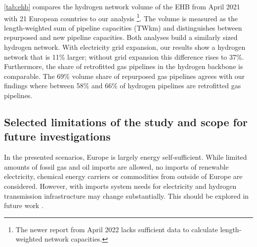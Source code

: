 
\cref{tab:ehb} compares the hydrogen network volume of the EHB from April 2021 with 21 European countries
to our analysis \cite{gasforclimateExtendingEuropean2021}\footnote{The newer
report from April 2022 \cite{gasforclimateEuropeanHydrogen2022} lacks sufficient
data to calculate length-weighted network capacities.}. The volume is measured
as the length-weighted sum of pipeline capacities (TWkm) and distinguishes
between repurposed and new pipeline capacities. Both analyses build a similarly
sized hydrogen network. With electricity grid expansion, our results show a
hydrogen network that is 11\% larger; without grid expansion this difference
rises to 37\%. Furthermore, the share of retrofitted gas pipelines in the
hydrogen backbone is comparable. The 69\% volume share of repurposed gas
pipelines \cite{gasforclimateExtendingEuropean2021} agrees with our findings
where between 58\% and 66\% of hydrogen pipelines are retrofitted gas pipelines.

\subsection*{Selected limitations of the study and scope for future investigations}


In the presented scenarios, Europe is largely energy self-sufficient. While
limited amounts of fossil gas and oil imports are allowed, no imports of
renewable electricity, chemical energy carriers or commodities from outside of
Europe are considered. However, with imports system needs for electricity and
hydrogen transmission infrastructure may change substantially. This should be
explored in future work
\cite{fasihiTechnoeconomicAssessment2019,heuserTechnoeconomicAnalysis2019,hamppImportOptions2021}.

